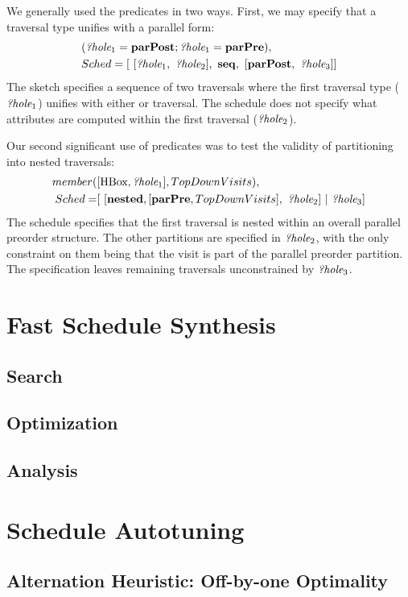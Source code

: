 We generally used the predicates in two ways. First, we may specify that a traversal type unifies with a parallel form:
\begin{align*}
& ({\emph{?hole}}_1 = \text{\textbf{parPost}} ; {\emph{?hole}}_1 =  \text{\textbf{parPre}}), \\
& Sched = [~[{\emph{?hole}}_1, ~ {\emph{?hole}}_2], ~ \text{\textbf{seq}}, ~ [\text{\textbf{parPost}}, ~{\emph{?hole}}_3]]
\end{align*}
The sketch specifies a sequence of two traversals where the first traversal type (${\emph{?hole}}_1$) unifies with either   or  traversal. The schedule does not specify what attributes are computed within the first traversal (${\emph{?hole}}_2$). 

Our second significant use of predicates was to test the validity of partitioning into nested traversals:
\begin{align*}
member(&[\text{HBox}, {\emph{?hole}}_1], TopDownVisits),\\
Sched =& [ ~ [\text{\textbf{nested}},  [\text{\textbf{parPre}}, TopDownVisits], ~{\emph{?hole}}_2] ~ | ~ {\emph{?hole}}_3]
\end{align*}
The schedule specifies that the first traversal is nested within an overall parallel preorder structure. The other partitions are specified in ${\emph{?hole}}_2$, with the only constraint on them being that the  visit is part of the parallel preorder partition. The specification leaves remaining traversals unconstrained by ${\emph{?hole}}_3$.



\section{Fast Schedule Synthesis}
\subsection{Search}
\subsection{Optimization}
\subsection{Analysis}

\section{Schedule Autotuning}
\label{sec:schedtuning}
\subsection{Alternation Heuristic: Off-by-one Optimality}
